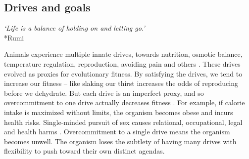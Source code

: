 \documentclass[12pt]{article}
\begin{document}







\subsection{Drives and goals}

\begin{center}
\textit{`Life is a balance of holding on and letting go.'}\\*Rumi
\end{center}

Animals experience multiple innate drives, towards nutrition, osmotic balance, temperature regulation, reproduction, avoiding pain and others \citep{saper2014hypothalamus, schulkin2019allostasis, sewards2003representations}. These drives evolved as proxies for evolutionary fitness. By satisfying the drives, we tend to increase our fitness -- like slaking our thirst increases the odds of reproducing before we dehydrate. But each drive is an imperfect proxy, and so overcommitment to one drive actually decreases fitness \citep{kurthnelson2024dynamic,john2023dead, williams1966adaptation, tooby1992psychological}. For example, if calorie intake is maximized without limits, the organism becomes obese and incurs health risks. Single-minded pursuit of sex causes relational, occupational, legal and health harms \citep{kraus2016should, carnes2001out}. Overcommitment to a single drive means the organism becomes unwell. The organism loses the subtlety of having many drives with flexibility to push toward their own distinct agendas.
\end{document}
